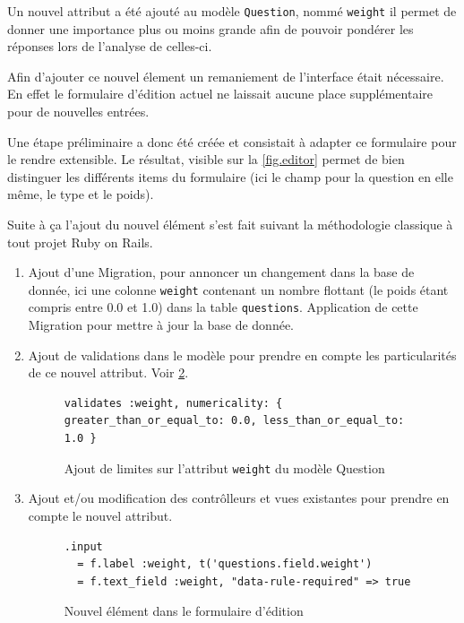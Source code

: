 \documentclass[12pt,a4paper]{book}
\begin{document}
Un nouvel attribut a été ajouté au modèle \texttt{Question}, nommé \texttt{weight} il permet de donner une importance plus ou moins grande afin de pouvoir pondérer les réponses lors de l'analyse de celles-ci.

Afin d'ajouter ce nouvel élement un remaniement de l'interface était nécessaire. En effet le formulaire d'édition actuel ne laissait aucune place supplémentaire pour de nouvelles entrées.

Une étape préliminaire a donc été créée et consistait à adapter ce formulaire pour le rendre extensible. Le résultat, visible sur la \cref{fig.editor} permet de bien distinguer les différents items du formulaire (ici le champ pour la question en elle même, le type et le poids).

Suite à ça l'ajout du nouvel élément s'est fait suivant la méthodologie classique à tout projet Ruby on Rails.

\begin{enumerate}
  \item Ajout d'une Migration, pour annoncer un changement dans la base de donnée, ici une colonne \texttt{weight} contenant un nombre flottant (le poids étant compris entre 0.0 et 1.0) dans la table \texttt{questions}. Application de cette Migration pour mettre à jour la base de donnée.
  \item Ajout de validations dans le modèle pour prendre en compte les particularités de ce nouvel attribut. Voir \cref{fig.weight_validation}.
  
  \begin{figure}[h]
  \lstset{language=ruby}
  \begin{lstlisting}
validates :weight, numericality: { greater_than_or_equal_to: 0.0, less_than_or_equal_to: 1.0 }
  \end{lstlisting}
   \caption{Ajout de limites sur l'attribut \texttt{weight} du modèle Question}
  \label{fig.weight_validation}
  \end{figure}
  \item Ajout et/ou modification des contrôlleurs et vues existantes pour prendre en compte le nouvel attribut.

  \begin{figure}[h]
  \lstset{language=ruby}
  \begin{lstlisting}
.input
  = f.label :weight, t('questions.field.weight')
  = f.text_field :weight, "data-rule-required" => true
  \end{lstlisting}
   \caption{Nouvel élément dans le formulaire d'édition}
  \label{fig.weight_validation}
  \end{figure}
  
\end{enumerate}
\end{document}
